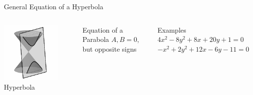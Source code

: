 \documentclass[14pt,aspectratio=169]{beamer}
\begin{document}
\begin{frame}{General Equation of a Hyperbola}
 \begin{columns}
      \centering
        \includegraphics[width=0.8\textwidth]{image10.png}\\Hyperbola
        \begin{block}{Equation of a Parabola}\centering
        $A,B=0$, but opposite signs  \\
        \end{block}

        \begin{exampleblock}{Examples}
         $4x^2 - 8y^2 + 8x + 20y + 1 = 0$ \\
         $-x^2 + 2y^2 + 12x - 6y - 11 = 0$
        \end{exampleblock}

    \end{columns}
\end{frame}
\end{document}
